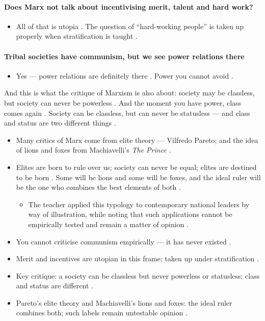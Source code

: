 \paragraph{Does Marx not talk about incentivising merit, talent and hard work?}
\begin{itemize}
    \item All of that is utopia . The question of ``hard-working people'' is taken up properly when stratification is taught .
\end{itemize}

\paragraph{Tribal societies have communism, but we see power relations there}
\begin{itemize}
    \item Yes --- power relations are definitely there . Power you cannot avoid .
\end{itemize}

\begin{CriticalPoint}
And this is what the critique of Marxism is also about: society may be classless, but society can never be powerless . And the moment you have power, class comes again . Society can be classless, but can never be statusless --- and class and status are two different things .
\end{CriticalPoint}

\begin{itemize}
    \item Many critics of Marx come from elite theory --- Vilfredo Pareto; and the idea of lions and foxes from Machiavelli's \emph{The Prince} .
    \item Elites are born to rule over us; society can never be equal; elites are destined to be born . Some will be lions and some will be foxes, and the ideal ruler will be the one who combines the best elements of both .
    \begin{itemize}
        \item The teacher applied this typology to contemporary national leaders by way of illustration, while noting that such applications cannot be empirically tested and remain a matter of opinion .
    \end{itemize}
\end{itemize}

\begin{QuickRevision}
\begin{itemize}
    \item You cannot criticise communism empirically --- it has never existed .
    \item Merit and incentives are utopian in this frame; taken up under stratification .
    \item Key critique: a society can be classless but never powerless or statusless; class and status are different .
    \item Pareto's elite theory and Machiavelli's lions and foxes: the ideal ruler combines both; such labels remain untestable opinion .
\end{itemize}
\end{QuickRevision}

